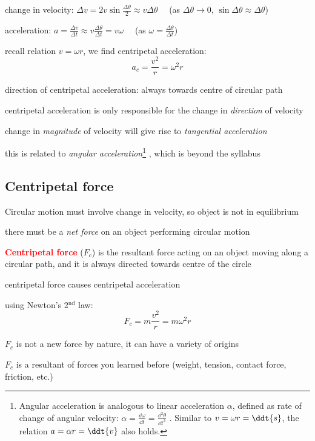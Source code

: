 \documentclass[a4paper,12pt]{book}
\newcommand{\cmt}{}
\newcommand{\piste}{{\fontencoding{U}\fontfamily{futs}\selectfont\char 49\relax}}
\newenvironment{ilight}
  {\centering
  	\vspace*{6pt}
  	\begin{tcolorbox}[colframe=Gray,colback=LightGrey!15]
  \setlength{\baselineskip}{\baselineskip}%
  }
  {\end{tcolorbox}\vspace*{-4pt}}
\newcommand{\keypoint}[1]{\textbf{\textcolor{red}{#1}}}
\newcommand{\tcbhighmath}[1]{\boxed{#1}}
\newcommand{\piste}{\textsuperscript{$\star$}}
\newcommand{\keypoint}[1]{\textbf{\textcolor{red}{#1}}}
\newcommand{\cmt}{}
\begin{document}
	change in velocity: $\Delta v = 2v\sin\frac{\Delta \theta}{2} \approx v \Delta \theta \quad$ (as $\Delta \theta \to 0$, $\sin \Delta \theta \approx \Delta \theta$)
	
	acceleration: $a = \frac{\Delta v}{\Delta t} \approx v \frac{\Delta \theta}{\Delta t} = v \omega \quad$ (as $\omega = \frac{\Delta \theta}{\Delta t}$)
	
	recall relation $v = \omega r$, we find centripetal acceleration: $$\tcbhighmath{a_c = \frac{v^2}{r} = \omega^2 r}$$

\cmt direction of centripetal acceleration: always towards centre of circular path
	
\cmt centripetal acceleration is only responsible for the change in \emph{direction} of velocity

change in \emph{magnitude} of velocity will give rise to \emph{tangential acceleration}

this is related to \emph{angular acceleration}\footnote{Angular acceleration is analogous to linear acceleration $\alpha$, defined as rate of change of angular velocity: $\alpha = \frac{\dd \omega}{\dd t} = \frac{\dd^2 \theta}{\dd t^2}$ \piste. Similar to $v=\omega r = \ddt{s}$, the relation $a=\alpha r = \ddt{v}$ also holds.}  , which is beyond the syllabus

\subsection{Centripetal force}

Circular motion must involve change in velocity, so object is not in equilibrium 

there must be a \emph{net force} on an object performing circular motion 

\begin{ilight}
	\keypoint{Centripetal force} ($F_c$) is the resultant force acting on an object
	moving along a circular path, and it is always directed towards centre of the circle
\end{ilight}

\cmt centripetal force causes centripetal acceleration

using Newton's 2$^\text{nd}$ law: $$\tcbhighmath{ F_c = m\frac{v^2}{r} = m\omega^2r}$$

\cmt $F_c$ is not a new force by nature, it can have a variety of origins

$F_c$ is a resultant of forces you learned before (weight, tension, contact force, friction, etc.)
\end{document}
